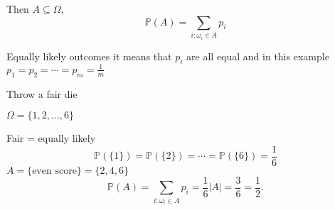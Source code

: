 \documentclass[10pt, a4paper]{article}
\begin{document}
Then $A \subseteq \Omega$,
\[
\mathbb{P}(A) = \sum_{i : \omega_i \in A}p_i
\]

Equally likely outcomes it means that $p_i$ are all equal and in this example $p_1 = p_2 = \dotsi = p_m = \frac{1}{m}$

\begin{example}
    Throw a fair die

    $\Omega = \{1, 2, \dots, 6\}$

    Fair = equally likely
    \[
    \mathbb{P}(\{1\}) = \mathbb{P}(\{2\}) = \dotsi = \mathbb{P}(\{6\}) = \frac{1}{6}
    \]
    $A = \{\text{even score}\} = \{2, 4, 6\}$
    \[
    \mathbb{P}(A) = \sum_{i : \omega_i \in A}p_i = \frac{1}{6}|A| = \frac{3}{6} = \frac{1}{2}.
    \]
\end{example}
\end{document}
